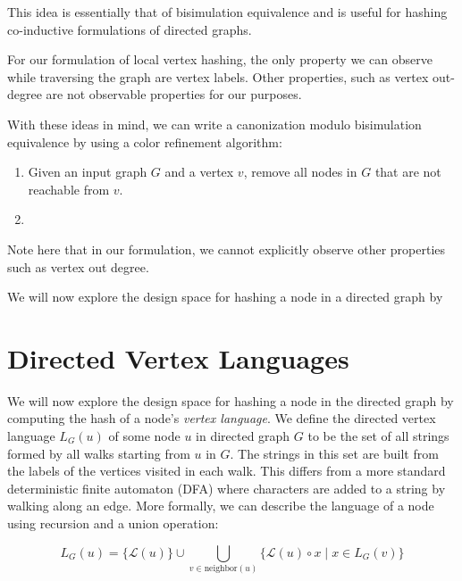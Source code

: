 \documentclass{svproc}
\begin{document}
This idea is essentially that of bisimulation equivalence and is useful for hashing co-inductive formulations of directed graphs.

For our formulation of local vertex hashing, the only property we can observe while traversing the graph are vertex labels. Other properties, such as vertex out-degree are not observable properties for our purposes.

With these ideas in mind, we can write a canonization modulo bisimulation equivalence by using a color refinement algorithm:

\begin{enumerate}
  \item Given an input graph $G$ and a vertex $v$, remove all nodes in $G$ that are not reachable from $v$.
  \item 
\end{enumerate}

Note here that in our formulation, we cannot explicitly observe other properties such as vertex out degree.




We will now explore the design space for hashing a node in a directed graph by 


\section{Directed Vertex Languages}

We will now explore the design space for hashing a node in the directed graph
by computing the hash of a node's \textit{vertex language}. We define the directed vertex
language $L_G(u)$ of some node $u$ in directed graph
$G$ to be the set of all strings formed by all walks starting from $u$ in $G$. The strings
in this set are built from the labels of the vertices visited in each walk. This differs from a
more standard deterministic finite automaton (DFA) where characters are added to a string by
walking along an edge. More formally, we can describe the language of a node using recursion
and a union operation:

\begin{equation}
  L_G(u) = \{\mathcal{L}(u)\} \cup \bigcup_{v \in \text{neighbor}(u)} \{\mathcal{L}(u) \circ x \mid x \in L_G(v)\}
\end{equation}
\end{document}

